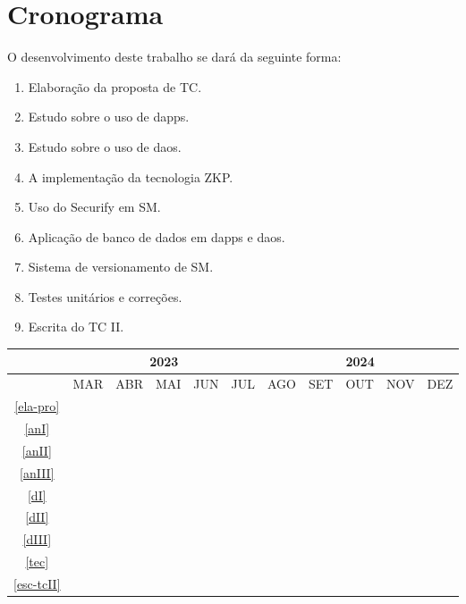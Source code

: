 
\chapter{Cronograma}

O desenvolvimento deste trabalho se dará da seguinte forma:

\begin{enumerate}
    \item \label{ela-pro} Elaboração da proposta de TC.
    \item \label{anI} Estudo sobre o uso de dapps.
    \item \label{anII} Estudo sobre o uso de daos.
    \item \label{anIII} A implementação da tecnologia ZKP.
    \item \label{dI} Uso do Securify em SM.
    \item \label{dII} Aplicação de banco de dados em dapps e daos.
    \item \label{dIII} Sistema de versionamento de SM.
    \item \label{tec} Testes unitários e correções.
    \item \label{esc-tcII} Escrita do TC II.
\end{enumerate}

\begin{table}[!htbp]
    \centering
    \begin{tabular}{|c|c|c|c|c|c|c|c|c|c|c|}
        \hline
        &\multicolumn{5}{c|}{2023}&\multicolumn{5}{c|}{2024}\\
        \hline
        &MAR&ABR&MAI&JUN&JUL&AGO&SET&OUT&NOV&DEZ\\
        \hline
        \ref{ela-pro}&\cellcolor{midgray}&&&&&&&&&\\
        \hline
        \ref{anI}&&\cellcolor{midgray}&&&&&&&&\\
        \hline
        \ref{anII}&&\cellcolor{midgray}&&&&&&&&\\
        \hline
        \ref{anIII}&&\cellcolor{midgray}&\cellcolor{midgray}&&&&&&&\\
        \hline
        \ref{dI}&&&\cellcolor{midgray}&&&&&&&\\
        \hline
        \ref{dII}&&&\cellcolor{midgray}&\cellcolor{midgray}&&&&&&\\
        \hline
        \ref{dIII}&&&&\cellcolor{midgray}&\cellcolor{midgray}&&&&&\\
        \hline
        \ref{tec}&&&&&&&&\cellcolor{midgray}&\cellcolor{midgray}&\\
        \hline
        \ref{esc-tcII}&&&&&&&&\cellcolor{midgray}&\cellcolor{midgray}&\cellcolor{midgray}\\
        \hline
    \end{tabular}
\end{table}

